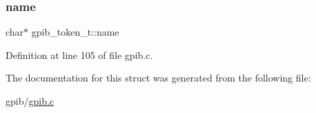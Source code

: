 \subsubsection{\texorpdfstring{name}{name}}
{\footnotesize\ttfamily char$\ast$ gpib\+\_\+token\+\_\+t\+::name}



Definition at line 105 of file gpib.\+c.



The documentation for this struct was generated from the following file\+:\begin{DoxyCompactItemize}
\item 
gpib/\hyperlink{gpib_8c}{gpib.\+c}\end{DoxyCompactItemize}
